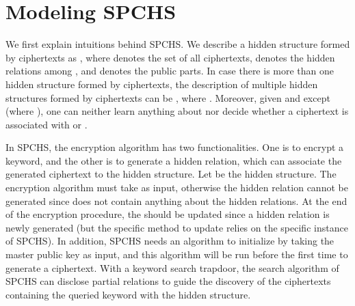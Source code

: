 \documentclass[10pt,twocolumn,twoside]{IEEEtran}
\begin{document}
\section{Modeling SPCHS}\label{S.SPCHS.Concept}

We first explain intuitions behind SPCHS. We describe a hidden structure formed by ciphertexts as , where  denotes the set of all ciphertexts,  denotes the hidden relations among , and  denotes the public parts. In case there is more than one hidden structure formed by ciphertexts, the description of multiple hidden structures formed by ciphertexts can be , where . Moreover, given  and  except  (where ), one can neither learn anything about  nor decide whether a ciphertext is associated with  or .

In SPCHS, the encryption algorithm has two functionalities. One is to encrypt a keyword, and the other is to generate a hidden relation, which can associate the generated ciphertext to the hidden structure. Let  be the hidden structure. The encryption algorithm must take  as input, otherwise the hidden relation cannot be generated since  does not contain anything about the hidden relations. At the end of the encryption procedure, the  should be updated since a hidden relation is newly generated (but the specific method to update  relies on the specific instance of SPCHS). In addition, SPCHS needs an algorithm to initialize  by taking the master public key as input, and this algorithm will be run before the first time to generate a ciphertext. With a keyword search trapdoor, the search algorithm of SPCHS can disclose partial relations
to guide the discovery of the ciphertexts containing the queried keyword with the hidden structure. 
\end{document}
